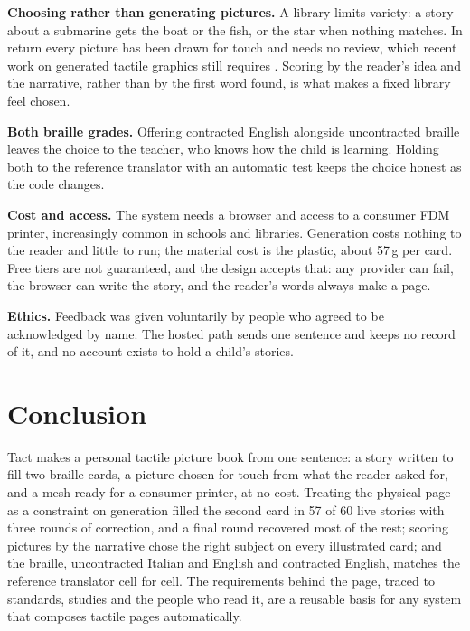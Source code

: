 \documentclass[conference]{IEEEtran}
\begin{document}
\textbf{Choosing rather than generating pictures.} A library limits variety: a story about a submarine gets the boat or the fish, or the star when nothing matches. In return every picture has been drawn for touch and needs no review, which recent work on generated tactile graphics still requires \cite{tanaka2025}. Scoring by the reader's idea and the narrative, rather than by the first word found, is what makes a fixed library feel chosen.

\textbf{Both braille grades.} Offering contracted English alongside uncontracted braille leaves the choice to the teacher, who knows how the child is learning. Holding both to the reference translator with an automatic test keeps the choice honest as the code changes.

\textbf{Cost and access.} The system needs a browser and access to a consumer FDM printer, increasingly common in schools and libraries. Generation costs nothing to the reader and little to run; the material cost is the plastic, about 57\,g per card. Free tiers are not guaranteed, and the design accepts that: any provider can fail, the browser can write the story, and the reader's words always make a page.

\textbf{Ethics.} Feedback was given voluntarily by people who agreed to be acknowledged by name. The hosted path sends one sentence and keeps no record of it, and no account exists to hold a child's stories.

\section{Conclusion}\label{sec:conclusion}

Tact makes a personal tactile picture book from one sentence: a story written to fill two braille cards, a picture chosen for touch from what the reader asked for, and a mesh ready for a consumer printer, at no cost. Treating the physical page as a constraint on generation filled the second card in 57 of 60 live stories with three rounds of correction, and a final round recovered most of the rest; scoring pictures by the narrative chose the right subject on every illustrated card; and the braille, uncontracted Italian and English and contracted English, matches the reference translator cell for cell. The requirements behind the page, traced to standards, studies and the people who read it, are a reusable basis for any system that composes tactile pages automatically.
\end{document}
